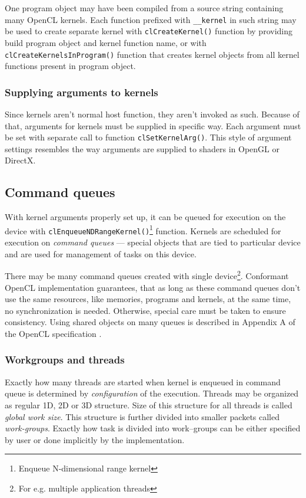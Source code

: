 One program object may have been compiled from a source string containing many
OpenCL kernels. Each function prefixed with \texttt{\_\_kernel} in such string
may be used to create separate kernel with \texttt{clCreate\-Kernel()} function by
providing build program object and kernel function name, or with
\texttt{clCreateKernelsInProgram()} function that creates kernel objects from
all kernel functions present in program object.

\subsubsection{Supplying arguments to kernels}

Since kernels aren't normal host function, they aren't invoked as such. Because
of that, arguments for kernels must be supplied in specific way. Each argument
must be set with separate call to function \texttt{clSetKernelArg()}. This style
of argument settings resembles the way arguments are supplied to shaders in OpenGL
or DirectX.

\subsection{Command queues}

With kernel arguments properly set up, it can be queued for execution on the
device with \texttt{clEnqueueNDRangeKernel()}\footnote{Enqueue N-dimensional range kernel}
function. Kernels are scheduled for execution on \emph{command queues} --- special
objects that are tied to particular device and are used for management of tasks
on this device.

There may be many command queues created with single
device\footnote{For e.g. multiple application threads}. Conformant OpenCL
implementation guarantees, that as long as these command queues don't use the
same resources, like memories, programs and kernels, at the same time, no
synchronization is needed. Otherwise, special care must be taken to ensure
consistency. Using shared objects on many queues is described in Appendix A
of the OpenCL specification \parencite{openclspec}.

\subsubsection{Workgroups and threads}
\label{subsub:clworkgroups}

Exactly how many threads are started when kernel is enqueued in command queue
is determined by \emph{configuration} of the execution. Threads may be organized
as regular 1D, 2D or 3D structure. Size of this structure for all threads is
called \emph{global work size}. This structure is further divided into smaller
packets called \emph{work-groups}. Exactly how task is divided into work--groups
can be either specified by user or done implicitly by the implementation.

